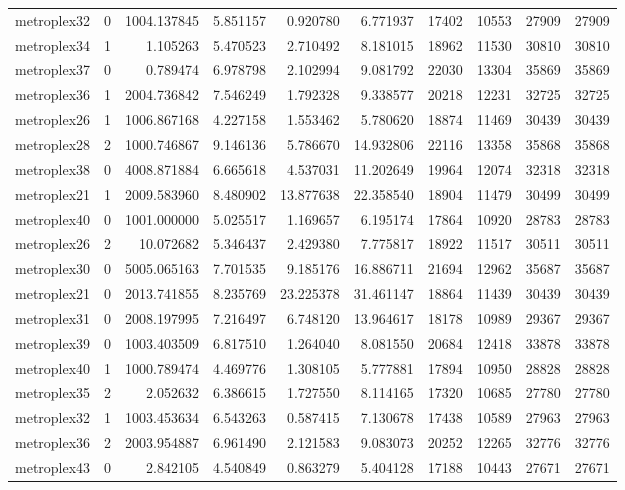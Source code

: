 \begin{longtable}{|l|r|r|r|r|r|r|r|r|r|}
metroplex32 & 0 & 1004.137845 & 5.851157 & 0.920780 & 6.771937 & 17402 & 10553 & 27909 & 27909 \\
metroplex34 & 1 & 1.105263 & 5.470523 & 2.710492 & 8.181015 & 18962 & 11530 & 30810 & 30810 \\
metroplex37 & 0 & 0.789474 & 6.978798 & 2.102994 & 9.081792 & 22030 & 13304 & 35869 & 35869 \\
metroplex36 & 1 & 2004.736842 & 7.546249 & 1.792328 & 9.338577 & 20218 & 12231 & 32725 & 32725 \\
metroplex26 & 1 & 1006.867168 & 4.227158 & 1.553462 & 5.780620 & 18874 & 11469 & 30439 & 30439 \\
metroplex28 & 2 & 1000.746867 & 9.146136 & 5.786670 & 14.932806 & 22116 & 13358 & 35868 & 35868 \\
metroplex38 & 0 & 4008.871884 & 6.665618 & 4.537031 & 11.202649 & 19964 & 12074 & 32318 & 32318 \\
metroplex21 & 1 & 2009.583960 & 8.480902 & 13.877638 & 22.358540 & 18904 & 11479 & 30499 & 30499 \\
metroplex40 & 0 & 1001.000000 & 5.025517 & 1.169657 & 6.195174 & 17864 & 10920 & 28783 & 28783 \\
metroplex26 & 2 & 10.072682 & 5.346437 & 2.429380 & 7.775817 & 18922 & 11517 & 30511 & 30511 \\
metroplex30 & 0 & 5005.065163 & 7.701535 & 9.185176 & 16.886711 & 21694 & 12962 & 35687 & 35687 \\
metroplex21 & 0 & 2013.741855 & 8.235769 & 23.225378 & 31.461147 & 18864 & 11439 & 30439 & 30439 \\
metroplex31 & 0 & 2008.197995 & 7.216497 & 6.748120 & 13.964617 & 18178 & 10989 & 29367 & 29367 \\
metroplex39 & 0 & 1003.403509 & 6.817510 & 1.264040 & 8.081550 & 20684 & 12418 & 33878 & 33878 \\
metroplex40 & 1 & 1000.789474 & 4.469776 & 1.308105 & 5.777881 & 17894 & 10950 & 28828 & 28828 \\
metroplex35 & 2 & 2.052632 & 6.386615 & 1.727550 & 8.114165 & 17320 & 10685 & 27780 & 27780 \\
metroplex32 & 1 & 1003.453634 & 6.543263 & 0.587415 & 7.130678 & 17438 & 10589 & 27963 & 27963 \\
metroplex36 & 2 & 2003.954887 & 6.961490 & 2.121583 & 9.083073 & 20252 & 12265 & 32776 & 32776 \\
metroplex43 & 0 & 2.842105 & 4.540849 & 0.863279 & 5.404128 & 17188 & 10443 & 27671 & 27671 \\

\end{longtable}
